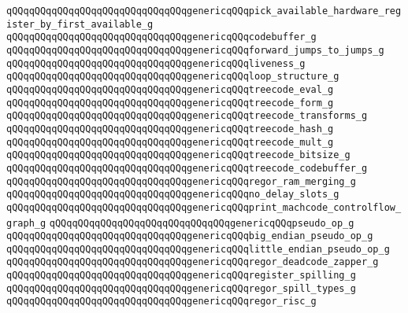 \verb|qQQqqQQqqQQqqQQqqQQqqQQqqQQqqQQqgenericqQQqpick_available_hardware_register_by_first_available_g|\newline
\verb|qQQqqQQqqQQqqQQqqQQqqQQqqQQqqQQqgenericqQQqcodebuffer_g|\newline
\verb|qQQqqQQqqQQqqQQqqQQqqQQqqQQqqQQqgenericqQQqforward_jumps_to_jumps_g|\newline
\verb|qQQqqQQqqQQqqQQqqQQqqQQqqQQqqQQqgenericqQQqliveness_g|\newline
\verb|qQQqqQQqqQQqqQQqqQQqqQQqqQQqqQQqgenericqQQqloop_structure_g|\newline
\verb|qQQqqQQqqQQqqQQqqQQqqQQqqQQqqQQqgenericqQQqtreecode_eval_g|\newline
\verb|qQQqqQQqqQQqqQQqqQQqqQQqqQQqqQQqgenericqQQqtreecode_form_g|\newline
\verb|qQQqqQQqqQQqqQQqqQQqqQQqqQQqqQQqgenericqQQqtreecode_transforms_g|\newline
\verb|qQQqqQQqqQQqqQQqqQQqqQQqqQQqqQQqgenericqQQqtreecode_hash_g|\newline
\verb|qQQqqQQqqQQqqQQqqQQqqQQqqQQqqQQqgenericqQQqtreecode_mult_g|\newline
\verb|qQQqqQQqqQQqqQQqqQQqqQQqqQQqqQQqgenericqQQqtreecode_bitsize_g|\newline
\verb|qQQqqQQqqQQqqQQqqQQqqQQqqQQqqQQqgenericqQQqtreecode_codebuffer_g|\newline
\verb|qQQqqQQqqQQqqQQqqQQqqQQqqQQqqQQqgenericqQQqregor_ram_merging_g|\newline
\verb|qQQqqQQqqQQqqQQqqQQqqQQqqQQqqQQqgenericqQQqno_delay_slots_g|\newline
\verb|qQQqqQQqqQQqqQQqqQQqqQQqqQQqqQQqgenericqQQqprint_machcode_controlflow_graph_g|\newline
\verb|qQQqqQQqqQQqqQQqqQQqqQQqqQQqqQQqgenericqQQqpseudo_op_g|\newline
\verb|qQQqqQQqqQQqqQQqqQQqqQQqqQQqqQQqgenericqQQqbig_endian_pseudo_op_g|\newline
\verb|qQQqqQQqqQQqqQQqqQQqqQQqqQQqqQQqgenericqQQqlittle_endian_pseudo_op_g|\newline
\verb|qQQqqQQqqQQqqQQqqQQqqQQqqQQqqQQqgenericqQQqregor_deadcode_zapper_g|\newline
\verb|qQQqqQQqqQQqqQQqqQQqqQQqqQQqqQQqgenericqQQqregister_spilling_g|\newline
\verb|qQQqqQQqqQQqqQQqqQQqqQQqqQQqqQQqgenericqQQqregor_spill_types_g|\newline
\verb|qQQqqQQqqQQqqQQqqQQqqQQqqQQqqQQqgenericqQQqregor_risc_g|\newline
